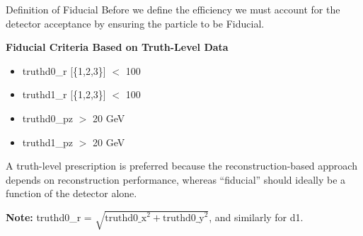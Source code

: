 

\begin{frame}{Definition of Fiducial}
    Before we define the efficiency we must account for the detector acceptance by ensuring the particle to be Fiducial.

    \vspace{0.5cm}
		\textbf{Fiducial Criteria Based on Truth-Level Data}
		\begin{itemize}
			\item truthd0\_r [\{1,2,3\}] $<$ 100
			\item truthd1\_r [\{1,2,3\}] $<$ 100
			\item truthd0\_pz $>$ 20 GeV
			\item truthd1\_pz $>$ 20 GeV	
		\end{itemize}

        \vspace{0.3cm}
        {\small
        A truth-level prescription is preferred because the reconstruction-based approach depends on reconstruction performance, whereas ``fiducial'' should ideally be a function of the detector alone.}

        \vspace{0.2cm}

        {\scriptsize
            \textbf{Note:} truthd0\_r = $\sqrt{\text{truthd0\_x}^2 + \text{truthd0\_y}^2}$, and similarly for d1.

        }
\end{frame}


